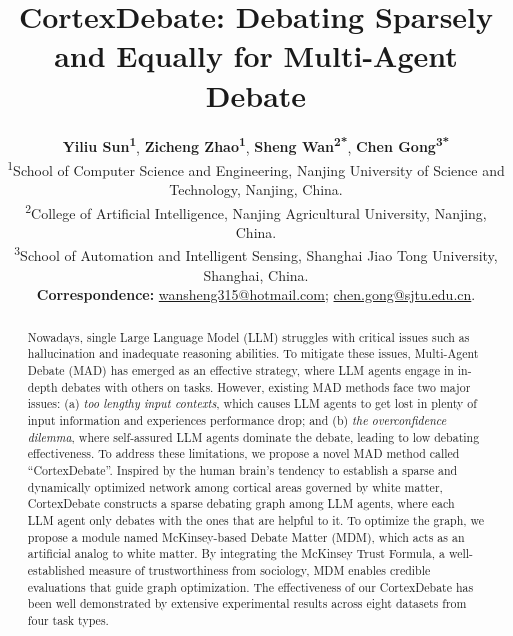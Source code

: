 \documentclass[11pt]{article}
\title{CortexDebate: Debating Sparsely and Equally for Multi-Agent Debate}
\author{
 \textbf{Yiliu Sun\textsuperscript{1}},
 \textbf{Zicheng Zhao\textsuperscript{1}},
 \textbf{Sheng Wan\textsuperscript{2*}},
 \textbf{Chen Gong\textsuperscript{3*}}
\\
 \textsuperscript{1}School of Computer Science and Engineering, Nanjing University of Science and \\Technology, Nanjing, China.
 \\
 \textsuperscript{2}College of Artificial Intelligence, Nanjing Agricultural University, Nanjing, China.
\\
\textsuperscript{3}School of Automation and Intelligent Sensing, Shanghai Jiao Tong University, \\Shanghai, China.
\\
 \small{
   \textbf{Correspondence:} \href{wansheng315@hotmail.com}{wansheng315@hotmail.com}; \href{chen.gong@sjtu.edu.cn}{chen.gong@sjtu.edu.cn}.
 }
}
\begin{document}
\maketitle
\begin{abstract}
    Nowadays, single Large Language Model (LLM) struggles with critical issues such as hallucination and inadequate reasoning abilities. To mitigate these issues, Multi-Agent Debate (MAD) has emerged as an effective strategy, where LLM agents engage in in-depth debates with others on tasks. However, existing MAD methods face two major issues: (a) \textit{too lengthy input contexts}, which causes LLM agents to get lost in plenty of input information and experiences performance drop; and (b) \textit{the overconfidence dilemma}, where self-assured LLM agents dominate the debate, leading to low debating effectiveness. To address these limitations, we propose a novel MAD method called ``CortexDebate''. Inspired by the human brain's tendency to establish a sparse and dynamically optimized network among cortical areas governed by white matter, CortexDebate constructs a sparse debating graph among LLM agents, where each LLM agent only debates with the ones that are helpful to it. To optimize the graph, we propose a module named McKinsey-based Debate Matter (MDM), which acts as an artificial analog to white matter. By integrating the McKinsey Trust Formula, a well-established measure of trustworthiness from sociology, MDM enables credible evaluations that guide graph optimization. The effectiveness of our CortexDebate has been well demonstrated by extensive experimental results across eight datasets from four task types.
\end{abstract}













%


\appendix









\end{document}
